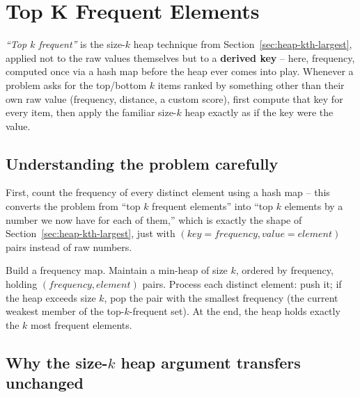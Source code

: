\section{Top K Frequent Elements}
\label{sec:heap-top-k-frequent}


\begin{patternbox}
\emph{``Top $k$ frequent''} is the size-$k$ heap technique from
Section~\ref{sec:heap-kth-largest}, applied not to the raw values
themselves but to a \textbf{derived key} -- here, frequency, computed once
via a hash map before the heap ever comes into play. Whenever a problem
asks for the top/bottom $k$ items ranked by something other than their
own raw value (frequency, distance, a custom score), first compute that
key for every item, then apply the familiar size-$k$ heap exactly as if
the key were the value.
\end{patternbox}

\subsection*{Understanding the problem carefully}

First, count the frequency of every distinct element using a hash map --
this converts the problem from ``top $k$ frequent elements'' into ``top
$k$ elements by a number we now have for each of them,'' which is exactly
the shape of Section~\ref{sec:heap-kth-largest}, just with $(\textit{key} =
\textit{frequency}, \textit{value} = \textit{element})$ pairs instead of
raw numbers.

\begin{ideabox}
Build a frequency map. Maintain a min-heap of size $k$, ordered by
frequency, holding $(\textit{frequency}, \textit{element})$ pairs.
Process each distinct element: push it; if the heap exceeds size $k$, pop
the pair with the smallest frequency (the current weakest member of the
top-$k$-frequent set). At the end, the heap holds exactly the $k$ most
frequent elements.
\end{ideabox}

\subsection*{Why the size-$k$ heap argument transfers unchanged}

